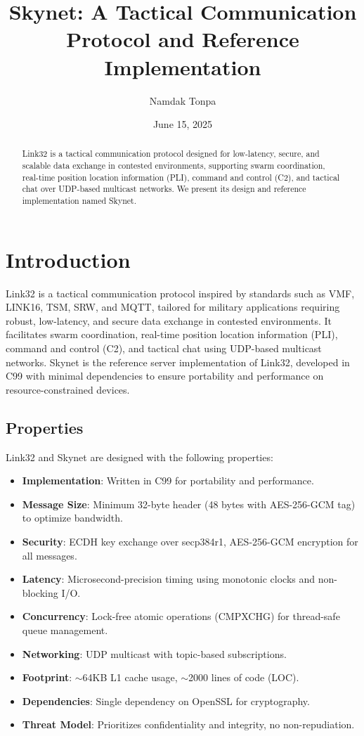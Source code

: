 \documentclass{article}
\begin{document}
\title{Skynet: A Tactical Communication Protocol and Reference Implementation}
\author{Namdak Tonpa}
\date{June 15, 2025}
\maketitle

\begin{abstract}
Link32 is a tactical communication protocol designed for low-latency, secure,
and scalable data exchange in contested environments, supporting swarm coordination,
real-time position location information (PLI), command and control (C2), and tactical
chat over UDP-based multicast networks.
We present its design and reference implementation named Skynet.
\end{abstract}

\newpage
\tableofcontents

\newpage
\section{Introduction}
Link32 is a tactical communication protocol inspired by standards such as VMF, LINK16,
TSM, SRW, and MQTT, tailored for military applications requiring robust, low-latency,
and secure data exchange in contested environments. It facilitates swarm coordination,
real-time position location information (PLI), command and control (C2), and tactical
chat using UDP-based multicast networks. Skynet is the reference server implementation
of Link32, developed in C99 with minimal dependencies to ensure portability and
 performance on resource-constrained devices.

\subsection{Properties}
Link32 and Skynet are designed with the following properties:
\begin{itemize}
    \item \textbf{Implementation}: Written in C99 for portability and performance.
    \item \textbf{Message Size}: Minimum 32-byte header (48 bytes with AES-256-GCM tag) to optimize bandwidth.
    \item \textbf{Security}: ECDH key exchange over secp384r1, AES-256-GCM encryption for all messages.
    \item \textbf{Latency}: Microsecond-precision timing using monotonic clocks and non-blocking I/O.
    \item \textbf{Concurrency}: Lock-free atomic operations (CMPXCHG) for thread-safe queue management.
    \item \textbf{Networking}: UDP multicast with topic-based subscriptions.
    \item \textbf{Footprint}: $\sim$64KB L1 cache usage, $\sim$2000 lines of code (LOC).
    \item \textbf{Dependencies}: Single dependency on OpenSSL for cryptography.
    \item \textbf{Threat Model}: Prioritizes confidentiality and integrity, no non-repudiation.
\end{itemize}
\end{document}
